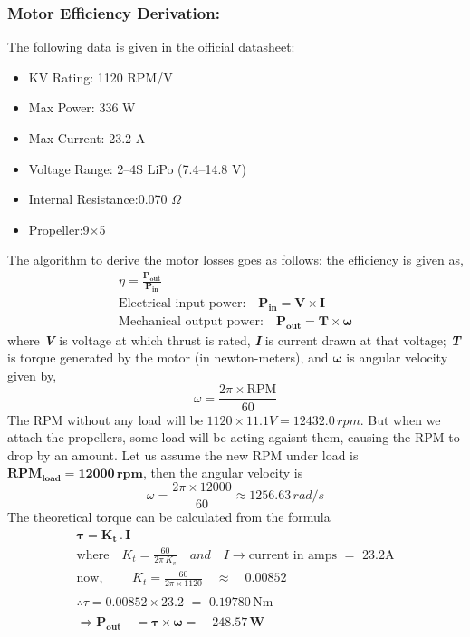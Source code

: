 \documentclass[12pt]{report}
\begin{document}
      \subsubsection{\large Motor Efficiency Derivation:}
      The following data is given in the official datasheet:
      \begin{itemize}
        \item KV Rating: \hfill1120 RPM/V
        \item Max Power: \hfill336 W
        \item Max Current: \hfill23.2 A
        \item Voltage Range: \hfill2–4S LiPo (7.4–14.8 V)
        \item Internal Resistance:\hfill 0.070 $\Omega$
        \item Propeller:\hfill 9×5
      \end{itemize}
      The algorithm to derive the motor losses goes as follows: the efficiency is given as,
      \begin{gather*}
        \eta = \frac{\boldsymbol{P_{out}}}{\boldsymbol{P_{in}}}  \\
        \text{Electrical input power:}\quad \boldsymbol{ P_{in} = V \times I} \\
        \text{Mechanical output power:} \quad \boldsymbol{ P_{out} = T \times \omega}
      \end{gather*}
      where \textbf{\textit{V}} is voltage at which thrust is rated, \textbf{\textit{I}} is current drawn at that voltage; \textbf{\textit{T}} is torque generated by the motor (in newton-meters), and $ \boldsymbol{\omega} $ is angular velocity given by, \[ \omega = \frac{2 \pi \times \text{RPM}}{60} \] 
      The RPM without any load will be $ 1120 \times 11.1V = 12432.0 \, rpm $. But when we attach the propellers, some load will be acting agaisnt them, causing the RPM to drop by an amount. Let us assume the new RPM under load is $ \boldsymbol{RPM_{load} = 12000\, rpm} $, then the angular velocity is \[ \omega = \frac{2 \pi \times 12000}{60} \approx 1256.63 \, rad/s\]
  The theoretical torque can be calculated from the formula 
  \begin{gather*} 
    \boldsymbol{\tau = K_t \, . \, I} \\
    \text{where} \quad K_t = \frac{60}{2 \pi \, K_v} \quad and \quad I \rightarrow \text{current in amps} \,\, = \,\, 23.2 \mathrm{A} \\
    \text{now, } \quad \quad K_t = \frac{60}{2 \pi \times 1120} \quad \approx \quad 0.00852 \\ \\
    \therefore \tau = 0.00852 \times 23.2 \, \, = \, \, 0.19780 \, \text{Nm} \\ \\
    \Rightarrow \boldsymbol{ P_{out} \quad = \tau \times \omega = \quad 248.57 \, \text{W} }
  \end{gather*}
  
\end{document}
